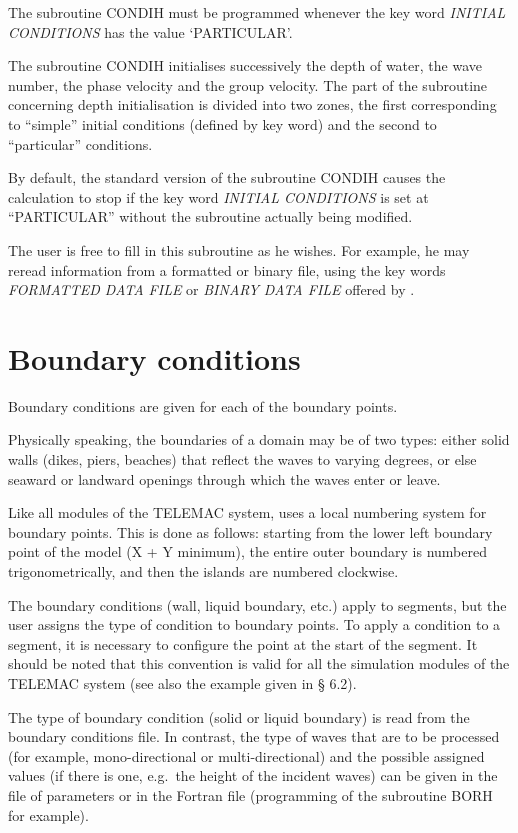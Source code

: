 The subroutine CONDIH must be programmed whenever the key word \textit{INITIAL
CONDITIONS} has the value `PARTICULAR'.

The subroutine CONDIH initialises successively the depth of water, the wave
number, the phase velocity and the group velocity. The part of the subroutine
concerning depth initialisation is divided into two zones, the first
corresponding to ``simple'' initial conditions (defined by key word) and the
second to ``particular'' conditions.

By default, the standard version of the subroutine CONDIH causes the
calculation to stop if the key word \textit{INITIAL CONDITIONS} is set at
``PARTICULAR'' without the subroutine actually being modified.

The user is free to fill in this subroutine as he wishes. For example, he may
reread information from a formatted or binary file, using the key words
\textit{FORMATTED DATA FILE} or \textit{BINARY DATA FILE} offered by
\artemis{}.


\chapter{Boundary conditions}\label{bnd_cond}

Boundary conditions are given for each of the boundary points.

Physically speaking, the boundaries of a domain may be of two types: either
solid walls (dikes, piers, beaches) that reflect the waves to varying degrees,
or else seaward or landward openings through which the waves enter or leave.

Like all modules of the TELEMAC system, \artemis{} uses a local numbering
system for boundary points. This is done as follows: starting from the lower
left boundary point of the model (X + Y minimum), the entire outer boundary is
numbered trigonometrically, and then the islands are numbered clockwise.

The boundary conditions (wall, liquid boundary, etc.) apply to segments, but
the user assigns the type of condition to boundary points. To apply a condition
to a segment, it is necessary to configure the point at the start of the
segment. It should be noted that this convention is valid for all the
simulation modules of the TELEMAC system (see also the example given in {\S}
6.2).

The type of boundary condition (solid or liquid boundary) is read from the
boundary conditions file. In contrast, the type of
waves that are to be processed (for example, mono-directional or
multi-directional) and the possible assigned values (if there is one, e.g.\ the
height of the incident waves) can be given in the file of parameters or
in the Fortran file (programming of the subroutine BORH for example).

